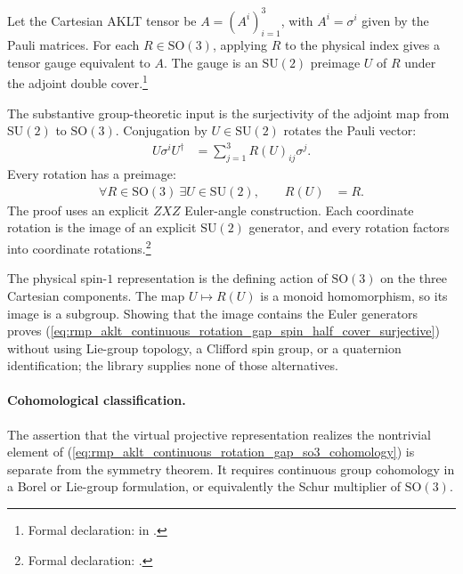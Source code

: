 \documentclass[11pt]{article}
\begin{document}
Let the Cartesian AKLT tensor be $A=(A^i)_{i=1}^3$, with
$A^i=\sigma^i$ given by the Pauli matrices. For each
$R\in\mathrm{SO}(3)$, applying $R$ to the physical index gives a tensor gauge
equivalent to $A$. The gauge is an $\mathrm{SU}(2)$ preimage $U$ of $R$ under
the adjoint double cover.\footnote{Formal declaration:
 in
.}

The substantive group-theoretic input is the surjectivity of the adjoint map
from $\mathrm{SU}(2)$ to $\mathrm{SO}(3)$. Conjugation by
$U\in\mathrm{SU}(2)$ rotates the Pauli vector:
\begin{align}
    U\sigma^iU^\dagger
        &= \sum_{j=1}^3 R(U)_{ij}\sigma^j.
    \label{eq:rmp_aklt_continuous_rotation_gap_pauli_adjoint_action}
\end{align}
Every rotation has a preimage:
\begin{align}
    \forall R\in\mathrm{SO}(3)\ \exists U\in\mathrm{SU}(2),
    \qquad
    R(U)
        &=R.
    \label{eq:rmp_aklt_continuous_rotation_gap_spin_half_cover_surjective}
\end{align}
The proof uses an explicit $ZXZ$ Euler-angle construction. Each coordinate
rotation is the image of an explicit $\mathrm{SU}(2)$ generator, and every
rotation factors into coordinate rotations.\footnote{Formal declaration:
.}

The physical spin-$1$ representation is the defining action of
$\mathrm{SO}(3)$ on the three Cartesian components. The map
$U\mapsto R(U)$ is a monoid homomorphism, so its image is a subgroup. Showing
that the image contains the Euler generators proves
(\ref{eq:rmp_aklt_continuous_rotation_gap_spin_half_cover_surjective}) without
using Lie-group topology, a Clifford spin group, or a quaternion
identification; the library supplies none of those alternatives.

\paragraph{Cohomological classification.}

The assertion that the virtual projective representation realizes the
nontrivial element of
(\ref{eq:rmp_aklt_continuous_rotation_gap_so3_cohomology}) is separate from
the symmetry theorem. It requires continuous group cohomology in a Borel or
Lie-group formulation, or equivalently the Schur multiplier of
$\mathrm{SO}(3)$.
\end{document}
